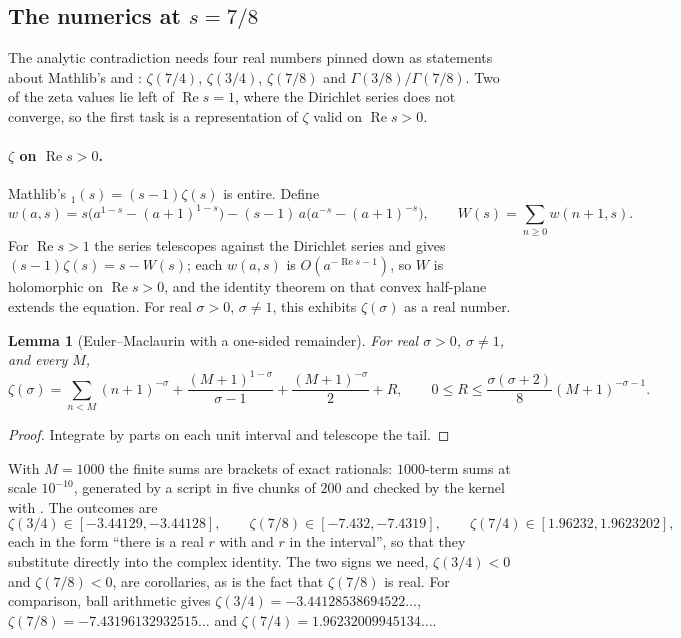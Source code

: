 \documentclass[11pt]{article}
\newtheorem{lemma}[theorem]{Lemma}
\theoremstyle{definition}
\newcommand{\re}{\operatorname{Re}}
\begin{document}
\subsection{The numerics at \texorpdfstring{$s = 7/8$}{s = 7/8}}\label{sec:numerics}

The analytic contradiction needs four real numbers pinned down as statements about Mathlib's  and : $\zeta(7/4)$, $\zeta(3/4)$, $\zeta(7/8)$ and $\Gamma(3/8)/\Gamma(7/8)$. Two of the zeta values lie left of $\re s = 1$, where the Dirichlet series does not converge, so the first task is a representation of $\zeta$ valid on $\re s > 0$.

\paragraph{$\zeta$ on $\re s > 0$.} Mathlib's $_1(s) = (s-1)\zeta(s)$ is entire. Define
\[
w(a, s) = s\bigl(a^{1-s} - (a+1)^{1-s}\bigr) - (s-1)\,a\bigl(a^{-s} - (a+1)^{-s}\bigr), \qquad W(s) = \sum_{n\ge0} w(n+1, s).
\]
For $\re s > 1$ the series telescopes against the Dirichlet series and gives $(s-1)\zeta(s) = s - W(s)$; each $w(a, s)$ is $O(a^{-\re s - 1})$, so $W$ is holomorphic on $\re s > 0$, and the identity theorem on that convex half-plane extends the equation. For real $\sigma > 0$, $\sigma \ne 1$, this exhibits $\zeta(\sigma)$ as a real number.

\begin{lemma}[Euler--Maclaurin with a one-sided remainder]\label{lem:em}
For real $\sigma > 0$, $\sigma \ne 1$, and every $M$,
\[
\zeta(\sigma) = \sum_{n<M}(n+1)^{-\sigma} + \frac{(M+1)^{1-\sigma}}{\sigma-1} + \frac{(M+1)^{-\sigma}}{2} + R, \qquad 0 \le R \le \frac{\sigma(\sigma+2)}{8}(M+1)^{-\sigma-1}.
\]
\end{lemma}

\begin{proof}
Integrate by parts on each unit interval and telescope the tail.
\end{proof}

With $M = 1000$ the finite sums are brackets of exact rationals: $1000$-term sums at scale $10^{-10}$, generated by a script in five chunks of $200$ and checked by the kernel with . The outcomes are
\[
\zeta(3/4) \in [-3.44129, -3.44128], \qquad \zeta(7/8) \in [-7.432, -7.4319], \qquad \zeta(7/4) \in [1.96232, 1.9623202],
\]
each in the form ``there is a real $r$ with  and $r$ in the interval'', so that they substitute directly into the complex identity. The two signs we need, $\zeta(3/4) < 0$ and $\zeta(7/8) < 0$, are corollaries, as is the fact that $\zeta(7/8)$ is real. For comparison, ball arithmetic gives $\zeta(3/4) = -3.44128538694522\ldots$, $\zeta(7/8) = -7.43196132932515\ldots$ and $\zeta(7/4) = 1.96232009945134\ldots$.
\end{document}
